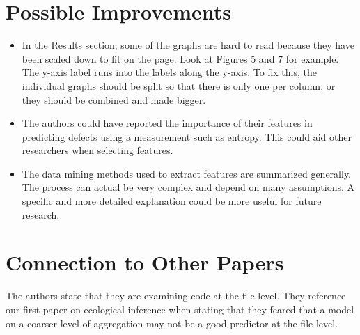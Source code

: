 \documentclass[english]{article}
\begin{document}
\section*{Possible Improvements}
\begin{itemize}
\item In the Results section, some of the graphs are hard to read because they have been scaled down to fit on the page. Look at Figures 5 and 7 for example. The y-axis label runs into the labels along the y-axis. To fix this, the individual graphs should be split so that there is only one per column, or they should be combined and made bigger.
\item The authors could have reported the importance of their features in predicting defects using a measurement such as entropy. This could aid other researchers when selecting features.
\item The data mining methods used to extract features are summarized generally. The process can actual be very complex and depend on many assumptions. A specific and more detailed explanation could be more useful for future research.
\end{itemize}

\section*{Connection to Other Papers}
The authors state that they are examining code at the file level. They reference our first paper on ecological inference \cite{Posnett} when stating that they feared that a model on a coarser level of aggregation may not be a good predictor at the file level. 



\end{document}
